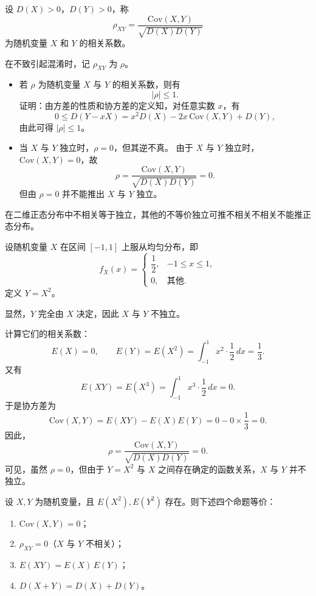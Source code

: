 \begin{definition}
设 $D(X) > 0$，$D(Y) > 0$，称
\[
\rho_{XY} = \frac{\mathrm{Cov}(X,Y)}{\sqrt{D(X)D(Y)}}
\]
为随机变量 $X$ 和 $Y$ 的相关系数。

在不致引起混淆时，记 $\rho_{XY}$ 为 $\rho$。
\end{definition}
\begin{proposition}[相关系数的性质]
\begin{itemize}
  \item[(1)] 若 $\rho$ 为随机变量 $X$ 与 $Y$ 的相关系数，则有
  \[
  |\rho| \le 1.
  \]
  证明：由方差的性质和协方差的定义知，对任意实数 $x$，有
  \[
  0 \le D(Y - xX) = x^2 D(X) - 2x\,\mathrm{Cov}(X,Y) + D(Y),
  \]
  由此可得 $|\rho| \le 1$。

  \item[(2)] 当 $X$ 与 $Y$ 独立时，$\rho = 0$，但其逆不真。  
  由于 $X$ 与 $Y$ 独立时，$\mathrm{Cov}(X,Y)=0$，故
  \[
  \rho = \frac{\mathrm{Cov}(X,Y)}{\sqrt{D(X)D(Y)}} = 0.
  \]
  但由 $\rho = 0$ 并不能推出 $X$ 与 $Y$ 独立。
\end{itemize}
\end{proposition}
\begin{note}
    在二维正态分布中不相关等于独立，其他的不等价独立可推不相关不相关不能推正态分布。
\end{note}
\begin{example}
设随机变量 $X$ 在区间 $[-1,1]$ 上服从均匀分布，即
\[
f_X(x)=
\begin{cases}
\dfrac{1}{2}, & -1\le x\le 1,\\[3pt]
0, & \text{其他}.
\end{cases}
\]
定义 $Y = X^2$。

显然，$Y$ 完全由 $X$ 决定，因此 $X$ 与 $Y$ 不独立。

计算它们的相关系数：
\[
E(X)=0,\qquad E(Y)=E(X^2)=\int_{-1}^1 x^2 \cdot \frac{1}{2}\,dx = \frac{1}{3}.
\]
又有
\[
E(XY)=E(X^3)=\int_{-1}^1 x^3 \cdot \frac{1}{2}\,dx = 0.
\]
于是协方差为
\[
\mathrm{Cov}(X,Y)=E(XY)-E(X)E(Y)=0-0\times\frac{1}{3}=0.
\]
因此，
\[
\rho=\frac{\mathrm{Cov}(X,Y)}{\sqrt{D(X)D(Y)}}=0.
\]
可见，虽然 $\rho=0$，但由于 $Y=X^2$ 与 $X$ 之间存在确定的函数关系，$X$ 与 $Y$ 并不独立。
\end{example}
\begin{theorem}
设 $X,Y$ 为随机变量，且 $E(X^2),E(Y^2)$ 存在。则下述四个命题等价：
\begin{enumerate}[(1)]
  \item $\mathrm{Cov}(X,Y)=0$；
  \item $\rho_{XY}=0$（$X$ 与 $Y$ 不相关）；
  \item $E(XY)=E(X)\,E(Y)$；
  \item $D(X+Y)=D(X)+D(Y)$。
\end{enumerate}
\end{theorem}
